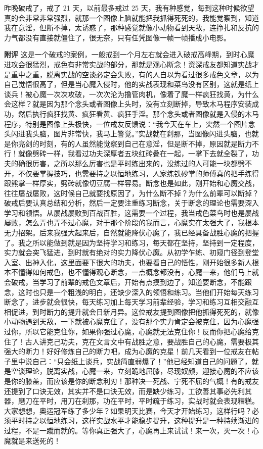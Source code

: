 \begin{case}
\end{case}

\begin{case}
    昨晚破戒了，戒了 21 天，以前最多戒过 25 天，我有种感觉，每到这种时候欲望真的会非常非常强烈，就那一个图像上脑就能把我抓得死死的，我能觉察到，知道我在意淫，但断不掉，太诱惑了，那种感觉就像小动物看到天敌，连挣扎和反抗的力气都没有直接就僵住了，很无奈，只有任凭图像一帧一帧播成小电影。

    \textbf{附评} 这是一个破戒的案例，一般戒到一个月左右就会进入破戒高峰期，到时心魔进攻会很猛烈，戒色有非常实战的部分，那就是观心断念！资深戒友都知道实战才是重中之重，脱离实战的空谈必定会失败，有的人自以为看过很多戒色文章，以为自己觉悟很高了，但是当心魔入侵时，他的实战表现和菜鸟没有区别，这就是纸上谈兵！被心魔一次次攻破，一次次沦为撸管肉机，像着了魔一样疯狂找黄，为什么会这样？就是因为那个念头或者图像上头时，没有立刻断掉，导致木马程序安装成功，然后执行疯狂找黄、疯狂看黄、疯狂手淫。那个念头或者图像就是入侵的木马程序，特别是图像上头极快，一位戒友反馈说：“我今天在车上，突然一个图片念头闪进我头脑，图片非常快，我马上警觉。”实战就在刹那，当图像闪进头脑，也就是你亮剑的时刻，有的人虽然能觉察到自己在意淫，但是断不掉，原因就是断力不行！就像劈砖一样，我看过功夫深厚者五块红砖叠在一起，一掌下去就全裂了，功夫的确很厉害，之所以那么厉害也是平时练出来的，没练过的人可能一块都劈不开，不仅要掌握技巧，也需要持之以恒地练习，人家练铁砂掌的师傅真的把手练得跟熊掌一样厚实，劈砖就像切豆腐一样容易。断念也是如此，刚开始和心魔交战，往往屡战屡败，这时候自己就要找原因了，为什么断不掉？为什么前辈可以断掉？破戒后要认真总结和分析，然后一定要注重练习断念，关于断念的理论也需要深入学习和领悟。从屡战屡败到百战百胜，这需要一个过程，我当戒色菜鸟时也是屡战屡败，怎么弄也弄不过心魔，对于那个阶段的我而言，心魔实在太强大了，我根本无力招架。后来我强大起来后，自然就能降伏心魔了，我已经具备战胜心魔的把握了。我之所以能做到就是因为坚持学习和练习，每天都在坚持，坚持到一定程度，实力就会突飞猛进，到时就有绝对的实力降伏心魔。从初学乍练、初窥门径到登堂入室、出神入化，这里面要下很大的功夫，也要看自己的悟性，刚开始很多新人根本不懂得如何戒色，也不懂得观心断念，一点概念都没有，心魔一来，他们马上就会破戒，当学习了前辈的戒色文章后，开始有点摸到边了，知道要断念，不能跟念，这时也只是一个粗浅的明白，还缺少深入的领悟和练习。当他们开始每天练习断念了，进步就会很快，每天练习加上每天学习前辈经验，学习和练习互相交融互相促进，到时断力的提升就会日新月异。这位戒友提到图像把他抓得死死的，就像小动物遇到天敌，一下就被心魔克住了，没有那个实力肯定会被克住，因为心魔强过你，所以它能克住你，如果你强过心魔，心魔就无法克住你！反而你把心魔给克住了！古人讲克己功夫，克在文言文中有战胜之意，要战胜自己的心魔，需要极其强大的断力！好好修炼自己的断力吧，成为心魔的克星！前几天看到一位戒友在帖子里中说自己：“只会纸上谈兵，实战简直弱爆了！”他已经知道自己的问题了，就是空谈理论，脱离实战，心魔一来，立刻跪地屈膝，尽现奴颜，迎接心魔的不应该是你的膝盖，而应该是你的断念利刃！那种决一死战、宁死不屈的气概！有的戒友还提到了口诀无效，其实并不是口诀无效，而是缺少练习，工欲善其事必先利其器，磨刀在平时，用刀在刹那，功在平时，平时疏于练习，实战时就会表现糟糕。大家想想，奥运冠军练了多少年？如果明天比赛，今天才开始练习，这样行吗？必须平时持之以恒地练习，这样实战水平才能稳步提升，这种提升是一种持续渐进的过程，不是一蹴而就的。等你真正强大了，心魔再上来试试！来一次，灭一次！心魔就是来送死的！

\end{case}
